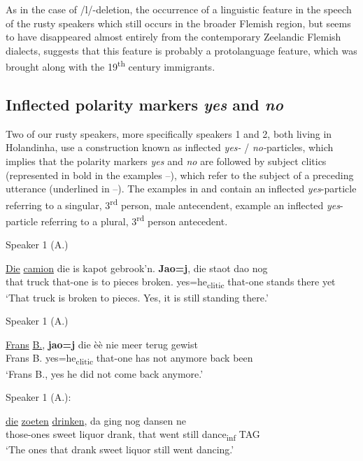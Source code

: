 \documentclass[output=paper,hidelinks,draftmode]{langscibook}
\begin{document}
As in the case of /l/-deletion, the occurrence of a linguistic feature in the speech of the rusty speakers which still occurs in the broader Flemish region, but seems to have disappeared almost entirely from the contemporary Zeelandic Flemish dialects, suggests that this feature is probably a protolanguage feature, which was brought along with the 19\textsuperscript{th} century immigrants. 

\subsection{Inflected polarity markers \emph{yes} and \emph{no}} 
\label{sec:53-inflectedpol}

Two of our rusty speakers, more specifically speakers 1 and 2, both living in Holandinha, use a construction known as inflected \textit{yes-} / \textit{no-}particles, which implies that the polarity markers \textit{yes} and \textit{no} are followed by subject clitics (represented in bold in the examples –), which refer to the subject of a preceding utterance (underlined in –). The examples in  and  contain an inflected \textit{yes}{}-particle referring to a singular, 3\textsuperscript{rd} person, male antecendent, example  an inflected \textit{yes}{}-particle referring to a plural, 3\textsuperscript{rd} person antecedent.

\ea Speaker 1 (A.)
\label{ex:schaffel:20}

\gll \ul{Die} \ul{camion} die is kapot gebrook'n. \textbf{Jao=j}, die staot dao nog\\
that truck that-one is {to pieces} broken. yes=he\textsubscript{clitic} that-one stands there yet\\
\glt ‘That truck is broken to pieces. Yes, it is still standing there.’ 

\z

\newpage
\ea Speaker 1 (A.)
\label{ex:schaffel:21}

\gll \ul{Frans} \ul{B.}, \textbf{jao=j} die èè nie meer terug gewist\\
Frans B. yes=he\textsubscript{clitic} that-one has not anymore back been\\
\glt ‘Frans B., yes he did not come back anymore.’
\z


\ea Speaker 1 (A.): 
\label{ex:schaffel:22}
 
\gll \ul{die} \ul{zoeten} \ul{drinken}, da ging nog dansen ne\\
those-ones {sweet liquor} drank, that went still dance\textsubscript{inf} TAG\\
\glt ‘The ones that drank sweet liquor still went dancing.’\\
\end{document}
